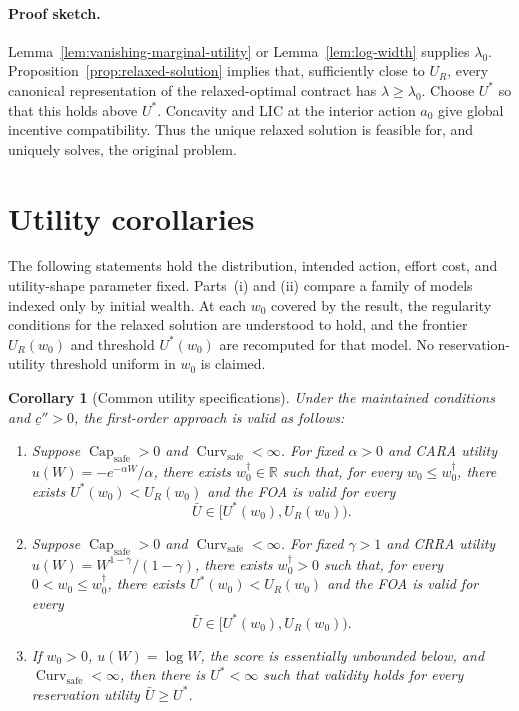 \documentclass[11pt]{article}
\newtheorem{corollary}{Corollary}
\theoremstyle{remark}
\newcommand{\R}{\mathbb R}
\DeclareMathOperator{\Capacity}{Cap}
\DeclareMathOperator{\Curv}{Curv}
\newcommand{\proofsketch}{\paragraph{Proof sketch.}}
\begin{document}
\proofsketch
Lemma~\ref{lem:vanishing-marginal-utility} or Lemma~\ref{lem:log-width} supplies
$\lambda_0$.  Proposition~\ref{prop:relaxed-solution} implies that, sufficiently
close to $U_R$, every canonical representation of the relaxed-optimal contract
has $\lambda\ge\lambda_0$.  Choose $U^*$ so that this holds above $U^*$.
Concavity and LIC at the interior action $a_0$ give global incentive
compatibility.  Thus the unique relaxed solution is feasible for, and uniquely
solves, the original problem.

\section{Utility corollaries}

The following statements hold the distribution, intended action, effort cost,
and utility-shape parameter fixed.  Parts~(i) and (ii) compare a family of models
indexed only by initial wealth.  At each $w_0$ covered by the result, the
regularity conditions for the relaxed solution are understood to hold, and the
frontier $U_R(w_0)$ and threshold $U^*(w_0)$ are recomputed for that model.  No
reservation-utility threshold uniform in $w_0$ is claimed.

\begin{corollary}[Common utility specifications]
\label{cor:common-utilities}
Under the maintained conditions and $\underline c''>0$, the first-order
approach is valid as follows:
\begin{enumerate}[label=(\roman*)]
 \item Suppose $\Capacity_{\mathrm{safe}}>0$ and
 $\Curv_{\mathrm{safe}}<\infty$.  For fixed $\alpha>0$ and CARA utility
 $u(W)=-e^{-\alpha W}/\alpha$, there exists $w_0^\dagger\in\R$ such that, for
 every $w_0\le w_0^\dagger$, there exists
 $U^*(w_0)<U_R(w_0)$ and the FOA is valid for every
 \[
  \bar U\in[U^*(w_0),U_R(w_0)).
 \]
 \item Suppose $\Capacity_{\mathrm{safe}}>0$ and
 $\Curv_{\mathrm{safe}}<\infty$.  For fixed $\gamma>1$ and CRRA utility
 $u(W)=W^{1-\gamma}/(1-\gamma)$, there exists $w_0^\dagger>0$ such that, for
 every $0<w_0\le w_0^\dagger$, there exists
 $U^*(w_0)<U_R(w_0)$ and the FOA is valid for every
 \[
  \bar U\in[U^*(w_0),U_R(w_0)).
 \]
 \item If $w_0>0$, $u(W)=\log W$, the score is essentially unbounded below, and
 $\Curv_{\mathrm{safe}}<\infty$, then there is $U^*<\infty$ such that validity
 holds for every reservation utility $\bar U\ge U^*$.
\end{enumerate}
\end{corollary}
\end{document}
